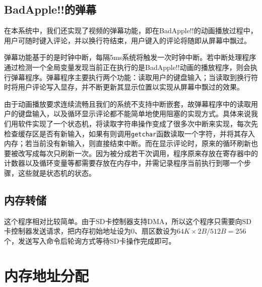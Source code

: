 \documentclass[11pt,utf8]{report}
\begin{document}
\subsection{BadApple!!的弹幕}

在本系统中，我们还实现了视频的弹幕功能，即在BadApple!!的动画播放过程中，用户可随时键入评论，并以换行符结束，用户键入的评论将随即从屏幕中飘过。

弹幕功能基于的是时钟中断，每隔5ms系统将触发一次时钟中断。若中断处理程序通过检测一个全局变量发现当前正在执行的是BadApple!!动画的播放程序，则会执行弹幕程序。弹幕程序主要执行两个功能：读取用户的键盘输入；当读取到换行符时将用户评论写入显存，并不断更新其显示位置以实现从屏幕中飘过的效果。

由于动画播放要求连续流畅且我们的系统不支持中断嵌套，故弹幕程序中的读取用户的键盘输入，以及循环显示评论都不能简单地使用阻塞的实现方式。具体来说我们用软件实现了一个状态机，将读取字符串操作变成了很多次中断来实现，每次先检查缓存区是否有新输入，如果有则调用\texttt{getchar}函数读取一个字符，并将其存入内存；若当前没有新输入，则直接结束中断。而在显示评论时，原来的循环刷新也要被改写成每次只刷新一次。因为被分成若干次调用，程序原来存放在寄存器中的计数器以及循环变量等都需要存放在内存中，并需记录程序当前执行到哪一个步骤，这些就是状态机的状态。

\subsection{内存转储}
	\par 这个程序相对比较简单。由于SD卡控制器支持DMA，所以这个程序只需要向SD卡控制器发送请求，把内存初始地址设为0、扇区数设为$64K \times 2B / 512B = 256$个，发送写入命令后轮询方式等待SD卡操作完成即可。

\section{内存地址分配}
\end{document}
